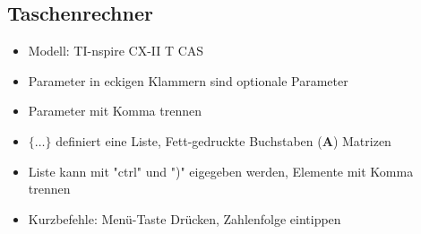 \subsection{Taschenrechner}
\begin{itemize}
    \item Modell: TI-nspire CX-II T CAS
    \item Parameter in eckigen Klammern sind optionale Parameter
    \item Parameter mit Komma trennen
    \item $\{\dots\}$ definiert eine Liste, Fett-gedruckte Buchstaben (\textbf{A}) Matrizen
    \item Liste kann mit "ctrl" und ")" eigegeben werden, Elemente mit Komma trennen
    \item Kurzbefehle: Menü-Taste Drücken, Zahlenfolge eintippen
\end{itemize}
